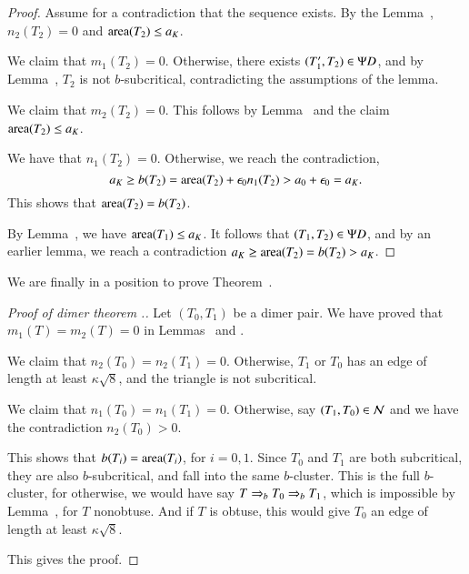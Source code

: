 \begin{proof}  Assume for a contradiction that the sequence exists.  
By the Lemma~, $n_2(T_2)=0$ and ${\operatorname{area}}(T_2)\le a_K$.

We claim that $m_1(T_2)=0$.  Otherwise, there exists $(T'_1,T_2)\in\Psi D$, and by Lemma~,
$T_2$ is not $b$-subcritical, contradicting the assumptions of the lemma.

We claim that $m_2(T_2)=0$.  This follows by Lemma~ and the claim ${\operatorname{area}}(T_2)\le a_K$.

We have that $n_1(T_2)=0$.  Otherwise, we reach the contradiction,
\[
a_K \ge b(T_2) ={\operatorname{area}}(T_2) + \epsilon_0 n_1(T_2) > a_0 + \epsilon_0 = a_K.
\]
This shows that ${\operatorname{area}}(T_2) = b(T_2)$.

By Lemma~, we have ${\operatorname{area}}(T_1)\le a_K$.
It follows that $(T_1,T_2)\in\Psi D$, and by an earlier lemma, 
we reach a contradiction $a_K \ge {\operatorname{area}}(T_2) = b(T_2) > a_K$.
\end{proof}
  
We are finally in a position to prove  Theorem~.

\begin{proof}[Proof of dimer theorem .]
Let $(T_0,T_1)$ be a dimer pair.   We have proved that $m_1(T)=m_2(T)=0$ in Lemmas~ and .

We claim that $n_2(T_0)=n_2(T_1)=0$.  Otherwise, $T_1$ or $T_0$ has an edge of length at least $\kappa\sqrt8$, and the triangle
is not subcritical.

We claim that $n_1(T_0)=n_1(T_1)=0$.  Otherwise, say $(T_1,T_0)\in\mathcal N$ and we have the contradiction $n_2(T_0)>0$.

This shows that $b(T_i)={\operatorname{area}}(T_i)$, for $i=0,1$.
Since $T_0$ and $T_1$ are both subcritical, they are also $b$-subcritical, and fall into the same $b$-cluster.
This is the full $b$-cluster, for otherwise, we would have say $T\Rightarrow_{b} T_0\Rightarrow_{b} T_1$, which is impossible by
Lemma~, for $T$ nonobtuse.  And if $T$ is obtuse, this would give $T_0$ an edge of length at least $\kappa\sqrt8$.

This gives the proof.
\end{proof}





